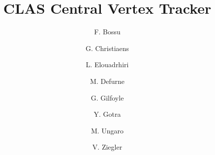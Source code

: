 \title{CLAS Central Vertex Tracker}

\author[A]{F. Bossu}
\author[A]{G. Christiaens}
\author[B]{L. Elouadrhiri}
\author[A]{M. Defurne}
\author[C]{G. Gilfoyle}
\author[B]{Y. Gotra}
\author[B]{M. Ungaro}
\author[B]{V. Ziegler}

\address[A]{CEA-Saclay - Gif-sur-Yvette, France}
\address[B]{Thomas Jefferson National Accelerator Facility, Newport News, VA, USA}
\address[C]{University of Richmond, Richmond, VA, USA}
